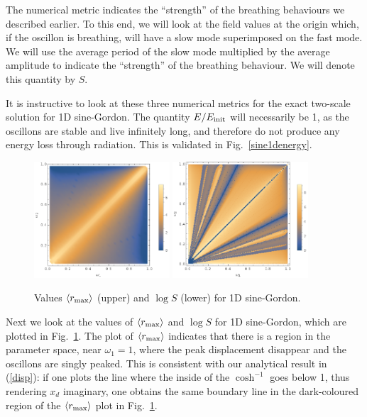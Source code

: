 \documentclass{report}
\begin{document}
The numerical metric indicates the ``strength'' of the breathing behaviours we described earlier. To this end, we will look at the field values at the origin which, if the oscillon is breathing, will have a slow mode superimposed on the fast mode. We will use the average period of the slow mode multiplied by the average amplitude to indicate the ``strength'' of the breathing behaviour. We will denote this quantity by $S$.

It is instructive to look at these three numerical metrics for the exact two-scale solution for 1D sine-Gordon. The quantity $E/E_{\rm init}$ will necessarily be 1, as the oscillons are stable and live infinitely long, and therefore do not produce any energy loss through radiation. This is validated in Fig.~\ref{sine1denergy}.

\begin{figure}
  \centering
  \includegraphics[width=0.45\textwidth]{plot/r_max-sine-1d.png}
  \includegraphics[width=0.45\textwidth]{plot/slow-mode-sine-1d.png}
  \caption{Values $\langle r_{\rm max}\rangle$ (upper) and  $\log{S}$ (lower) for 1D sine-Gordon.}\label{sine-1d}
\end{figure}

Next we look at the values of $\langle r_{\rm max}\rangle$ and $\log{S}$ for 1D sine-Gordon, which are plotted in Fig.~\ref{sine-1d}. The plot of $\langle r_{\rm max}\rangle$ indicates that there is a region in the parameter space, near $\omega_1=1$, where the peak displacement disappear and the oscillons are singly peaked. This is consistent with our analytical result in (\ref{disp}): if one plots the line where the inside of the $\cosh^{-1}$ goes below 1, thus rendering $x_d$ imaginary, one obtains the same boundary line in the dark-coloured region of the $\langle r_{\rm max}\rangle$ plot in Fig.~\ref{sine-1d}.
\end{document}
